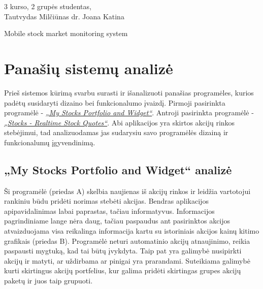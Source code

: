 \documentclass[a4paper,12pt,fleqn]{article}
\begin{document}
{3 kurso, 2 grupės studentas, \\ Tautvydas Milčiūnas} 
 {}{}{}{}%
 {dr. Joana Katina}

\tableofcontents

\bothabstracts{}%
{Mobile stock market monitoring system} %
{}%





\newpage
\section{Panašių sistemų analizė}
Prieš sistemos kūrimą svarbu surasti ir išanalizuoti panašias programėles, kurios padėtų susidaryti dizaino bei funkcionalumo įvaizdį. Pirmoji pasirinkta programėlė -
\href{https://play.google.com/store/apps/details?id=co.peeksoft.stocks}{\textit{„My Stocks Portfolio and Widget“}}.  Antroji pasirinkta programėlė - \href{https://play.google.com/store/apps/details?id=org.dayup.stocks}{\textit{„Stocks - Realtime Stock Quotes“}}. Abi aplikacijos yra skirtos akcijų rinkos stebėjimui, tad analizuodamas jas sudarysiu savo programėlės dizainą ir funkcionalumų įgyvendinimą.
\subsection{„My Stocks Portfolio and Widget“ analizė}
Ši programėlė (priedas A) skelbia naujienas iš akcijų rinkos ir leidžia vartotojui rankiniu būdu pridėti norimas stebėti akcijas. Bendras aplikacijos apipavidalinimas labai paprastas, tačiau informatyvus. Informacijos pagrindiniame lange nėra daug, tačiau paspaudus ant pasirinktos akcijos atvaizduojama visa reikalinga informacija kartu su istoriniais akcijos kainų kitimo grafikais (priedas B). Programėlė neturi automatinio akcijų atnaujinimo, reikia paspausti mygtuką, kad tai būtų įvykdyta. Taip pat yra galimybė nusipirkti akcijų ir matyti, ar uždirbama ar pinigai yra prarandami. Suteikiama galimybė kurti skirtingus akcijų portfelius, kur galima pridėti skirtingas grupes akcijų paketų ir juos taip grupuoti.
\end{document}
